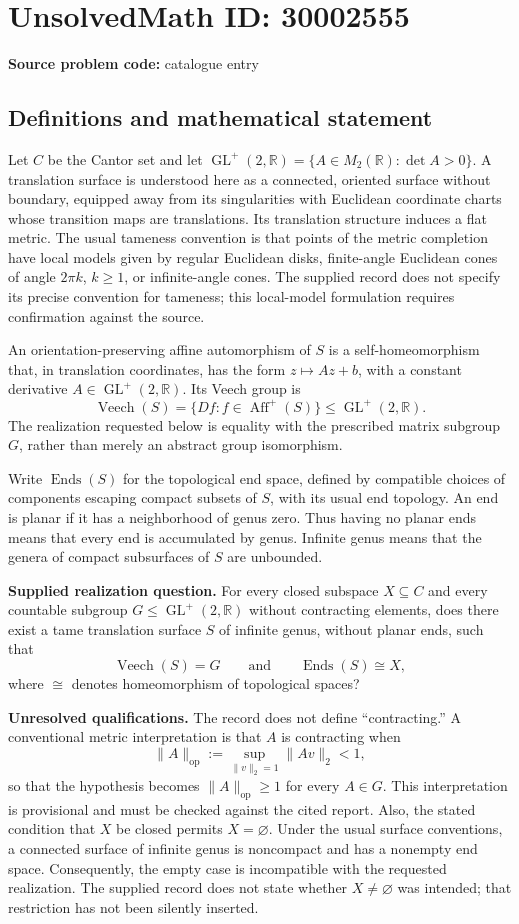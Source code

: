 \documentclass[11pt]{article}
\newcommand{\R}{\mathbb{R}}
\begin{document}
\section*{UnsolvedMath ID: 30002555}
\textbf{Source problem code:} catalogue entry
\subsection{Definitions and mathematical statement}
Let \(C\) be the Cantor set and let \(\operatorname{GL}^{+}(2,\R)=\{A\in M_2(\R):\det A>0\}\). A translation surface is understood here as a connected, oriented surface without boundary, equipped away from its singularities with Euclidean coordinate charts whose transition maps are translations. Its translation structure induces a flat metric. The usual tameness convention is that points of the metric completion have local models given by regular Euclidean disks, finite-angle Euclidean cones of angle \(2\pi k\), \(k\geq 1\), or infinite-angle cones. The supplied record does not specify its precise convention for tameness; this local-model formulation requires confirmation against the source.

An orientation-preserving affine automorphism of \(S\) is a self-homeomorphism that, in translation coordinates, has the form \(z\mapsto Az+b\), with a constant derivative \(A\in\operatorname{GL}^{+}(2,\R)\). Its Veech group is
\[
\operatorname{Veech}(S)=\{D f:f\in\operatorname{Aff}^{+}(S)\}\leq\operatorname{GL}^{+}(2,\R).
\]
The realization requested below is equality with the prescribed matrix subgroup \(G\), rather than merely an abstract group isomorphism.

Write \(\operatorname{Ends}(S)\) for the topological end space, defined by compatible choices of components escaping compact subsets of \(S\), with its usual end topology. An end is planar if it has a neighborhood of genus zero. Thus having no planar ends means that every end is accumulated by genus. Infinite genus means that the genera of compact subsurfaces of \(S\) are unbounded.

\textbf{Supplied realization question.} For every closed subspace \(X\subseteq C\) and every countable subgroup \(G\leq\operatorname{GL}^{+}(2,\R)\) without contracting elements, does there exist a tame translation surface \(S\) of infinite genus, without planar ends, such that
\[
\operatorname{Veech}(S)=G
\qquad\text{and}\qquad
\operatorname{Ends}(S)\cong X,
\]
where \(\cong\) denotes homeomorphism of topological spaces?

\textbf{Unresolved qualifications.} The record does not define ``contracting.'' A conventional metric interpretation is that \(A\) is contracting when
\[
\|A\|_{\mathrm{op}}:=\sup_{\|v\|_2=1}\|Av\|_2<1,
\]
so that the hypothesis becomes \(\|A\|_{\mathrm{op}}\geq1\) for every \(A\in G\). This interpretation is provisional and must be checked against the cited report. Also, the stated condition that \(X\) be closed permits \(X=\varnothing\). Under the usual surface conventions, a connected surface of infinite genus is noncompact and has a nonempty end space. Consequently, the empty case is incompatible with the requested realization. The supplied record does not state whether \(X\neq\varnothing\) was intended; that restriction has not been silently inserted.
\end{document}
